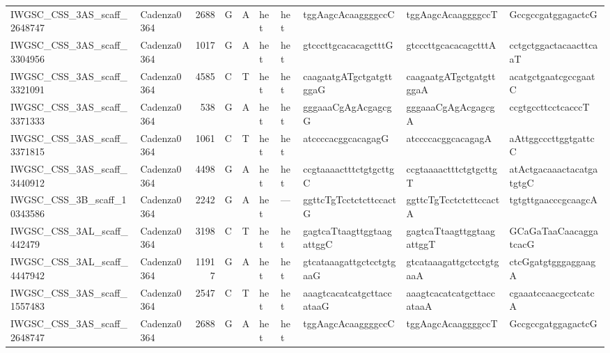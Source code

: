 \begin{longtable}{llrlllllll}
 IWGSC\_CSS\_3AS\_scaff\_2648747  & Cadenza0364 &       2688 & G         & A        & het            & het         & tggAagcAcaaggggccC        & tggAagcAcaaggggccT        & GccgccgatggagactcG        \\
 IWGSC\_CSS\_3AS\_scaff\_3304956  & Cadenza0364 &       1017 & G         & A        & het            & het         & gtcccttgcacacagctttG      & gtcccttgcacacagctttA      & cctgctggactacaacttcaaT    \\
 IWGSC\_CSS\_3AS\_scaff\_3321091  & Cadenza0364 &       4585 & C         & T        & het            & het         & caagaatgATgctgatgttggaG   & caagaatgATgctgatgttggaA   & acatgctgaatcgccgaatC      \\
 IWGSC\_CSS\_3AS\_scaff\_3371333  & Cadenza0364 &        538 & G         & A        & het            & het         & gggaaaCgAgAcgagcgG        & gggaaaCgAgAcgagcgA        & ccgtgccttcctcacccT        \\
 IWGSC\_CSS\_3AS\_scaff\_3371815  & Cadenza0364 &       1061 & C         & T        & het            & het         & atccccacggcacagagG        & atccccacggcacagagA        & aAttggcccttggtgattcC      \\
 IWGSC\_CSS\_3AS\_scaff\_3440912  & Cadenza0364 &       4498 & G         & A        & het            & het         & ccgtaaaactttctgtgcttgC    & ccgtaaaactttctgtgcttgT    & atActgacaaactacatgatgtgC  \\
 IWGSC\_CSS\_3B\_scaff\_10343586  & Cadenza0364 &       2242 & G         & A        & het            & ---         & ggttcTgTcctctcttccactG    & ggttcTgTcctctcttccactA    & tgtgttgaacccgcaagcA       \\
IWGSC\_CSS\_3AL\_scaff\_442479   & Cadenza0364 &       3198 & C         & T        & het            & het         & gagtcaTtaagttggtaagattggC & gagtcaTtaagttggtaagattggT & GCaGaTaaCaacaggatcacG     \\
 IWGSC\_CSS\_3AL\_scaff\_4447942  & Cadenza0364 &      11917 & G         & A        & het            & het         & gtcataaagattgctcctgtgaaG  & gtcataaagattgctcctgtgaaA  & ctcGgatgtgggaggaagA       \\
 IWGSC\_CSS\_3AS\_scaff\_1557483  & Cadenza0364 &       2547 & C         & T        & het            & het         & aaagtcacatcatgcttaccataaG & aaagtcacatcatgcttaccataaA & cgaaatccaacgcctcatcA      \\
 IWGSC\_CSS\_3AS\_scaff\_2648747  & Cadenza0364 &       2688 & G         & A        & het            & het         & tggAagcAcaaggggccC        & tggAagcAcaaggggccT        & GccgccgatggagactcG        \\

\end{longtable}
